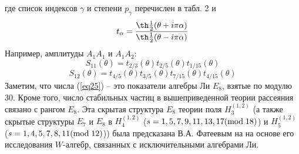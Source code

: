 \documentclass[12pt]{article}
\theoremstyle{definition}
\begin{document}
где список индексов $\gamma$ и степени $p_\gamma$ перечислен в табл. 2 и
\begin{equation}
    t_\alpha=\frac{\th\frac{1}{2}(\theta+i\pi\alpha)}{\th\frac{1}{2}(\theta-i\pi\alpha)}
\end{equation}
Например, амплитуды $A_1A_1$ и $A_1A_2$:
\begin{equation}
    S_{11}(\theta)=t_{2/3}(\theta)t_{2/5}(\theta)t_{1/15}(\theta)
\end{equation}
\begin{equation}
    S_{12}(\theta)=t_{4/5}(\theta)t_{3/5}(\theta)t_{7/15}(\theta)t_{4/15}(\theta)
\end{equation}
Заметим, что числа (\ref{eq25}) -- это показатели алгебры Ли $E_8$, взятые по модулю 30. Кроме того, число стабильных частиц в вышеприведенной теории рассеяния связано с рангом $E_8$. Эта скрытая структура $E_8$ теории поля $H_3^{(1,2)}$ (а также скрытые структуры $E_7$ и $E_8$ в $H^{(1,2)}_4$ ($s=1,5,7,9,11,13,17(\text{mod\;18})$) и $H^{(1,2)}_5$ ($s=1,4,5,7,8,11(\text{mod\;12})$)) была предсказана В.А. Фатеевым на на основе его исследования $W$-алгебр, связанных с исключительными алгебрами Ли.
\end{document}
